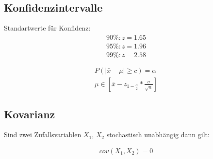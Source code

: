 \documentclass{article}
\begin{document}
\subsection{Konfidenzintervalle}
Standartwerte f\"ur Konfidenz:
\begin{align*}
	90\%:z = 1.65\\
	95\%:z = 1.96\\
	99\%:z = 2.58
\end{align*}

\begin{align}
	P(|\bar{x}-\mu| \geq c) = \alpha \\
	\mu \in [\bar{x} - z_{1-\frac{\alpha}{2}} * \frac{\sigma}{\sqrt{n}}]
\end{align}

\subsection{Kovarianz}
Sind zwei Zufallsvariablen $X_1$, $X_2$ stochastisch unabh\"angig dann
gilt:

\begin{align}
	cov(X_1,X_2) = 0
\end{align}
\end{document}
